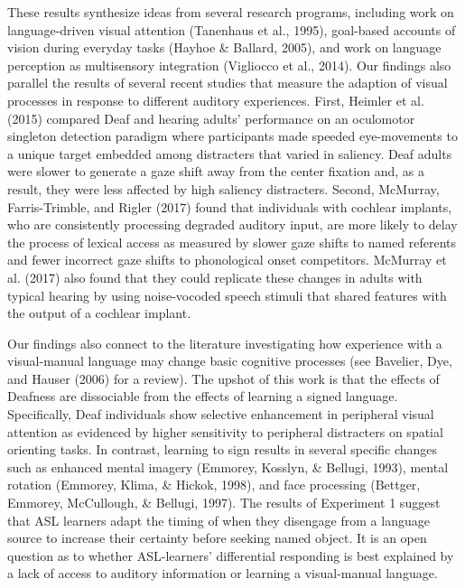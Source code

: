 \documentclass[,man,floatsintext]{apa6}
\begin{document}
These results synthesize ideas from several research programs, including
work on language-driven visual attention (Tanenhaus et al., 1995),
goal-based accounts of vision during everyday tasks (Hayhoe \& Ballard,
2005), and work on language perception as multisensory integration
(Vigliocco et al., 2014). Our findings also parallel the results of
several recent studies that measure the adaption of visual processes in
response to different auditory experiences. First, Heimler et al. (2015)
compared Deaf and hearing adults' performance on an oculomotor singleton
detection paradigm where participants made speeded eye-movements to a
unique target embedded among distracters that varied in saliency. Deaf
adults were slower to generate a gaze shift away from the center
fixation and, as a result, they were less affected by high saliency
distracters. Second, McMurray, Farris-Trimble, and Rigler (2017) found
that individuals with cochlear implants, who are consistently processing
degraded auditory input, are more likely to delay the process of lexical
access as measured by slower gaze shifts to named referents and fewer
incorrect gaze shifts to phonological onset competitors. McMurray et al.
(2017) also found that they could replicate these changes in adults with
typical hearing by using noise-vocoded speech stimuli that shared
features with the output of a cochlear implant.

Our findings also connect to the literature investigating how experience
with a visual-manual language may change basic cognitive processes (see
Bavelier, Dye, and Hauser (2006) for a review). The upshot of this work
is that the effects of Deafness are dissociable from the effects of
learning a signed language. Specifically, Deaf individuals show
selective enhancement in peripheral visual attention as evidenced by
higher sensitivity to peripheral distracters on spatial orienting tasks.
In contrast, learning to sign results in several specific changes such
as enhanced mental imagery (Emmorey, Kosslyn, \& Bellugi, 1993), mental
rotation (Emmorey, Klima, \& Hickok, 1998), and face processing
(Bettger, Emmorey, McCullough, \& Bellugi, 1997). The results of
Experiment 1 suggest that ASL learners adapt the timing of when they
disengage from a language source to increase their certainty before
seeking named object. It is an open question as to whether ASL-learners'
differential responding is best explained by a lack of access to
auditory information or learning a visual-manual language.
\end{document}

